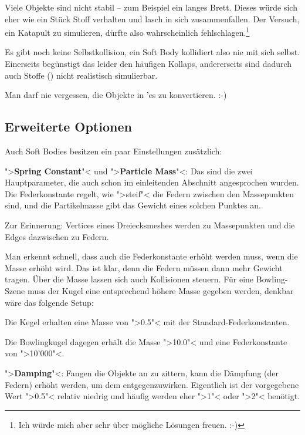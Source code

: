 \documentclass[10pt,DIV=14,a4paper]{scrartcl}
\begin{document}
	\item Viele Objekte sind nicht stabil -- zum Beispiel ein langes
	Brett. Dieses würde sich eher wie ein Stück Stoff verhalten und
	lasch in sich zusammenfallen. Der Versuch, ein Katapult zu
	simulieren, dürfte also wahrscheinlich fehlschlagen.\footnote{Ich
	würde mich aber sehr über mögliche Lösungen freuen. :-)}

	\item Es gibt noch keine Selbstkollision, ein Soft Body kollidiert
	also nie mit sich selbst. Einerseits begünstigt das leider den
	häufigen Kollaps, andererseits sind dadurch auch Stoffe
	() nicht realistisch simulierbar.

	\item Man darf nie vergessen, die Objekte in \TriMesh'es zu
	konvertieren. :-)

\itE

\subsection{Erweiterte Optionen}
Auch Soft Bodies besitzen ein paar Einstellungen zusätzlich:
\itA
	\item ">\textbf{Spring Constant}"< und ">\textbf{Particle Mass}"<:
	Das sind die zwei Hauptparameter, die auch schon im einleitenden
	Abschnitt angesprochen wurden. Die Federkonstante regelt, wie
	">steif"< die Federn zwischen den Massepunkten sind, und die
	Partikelmasse gibt das Gewicht eines solchen Punktes an.

	Zur Erinnerung: Vertices eines Dreiecksmeshes werden zu Massepunkten
	und die Edges dazwischen zu Federn.

	Man erkennt schnell, dass auch die Federkonstante erhöht werden
	muss, wenn die Masse erhöht wird. Das ist klar, denn die Federn
	müssen dann mehr Gewicht tragen. Über die Masse lassen sich auch
	Kollisionen steuern. Für eine Bowling-Szene muss der Kugel eine
	entsprechend höhere Masse gegeben werden, denkbar wäre das folgende
	Setup:

	\itA
		\item Die Kegel erhalten eine Masse von ">0.5"< mit der
		Standard-Federkonstanten.

		\item Die Bowlingkugel dagegen erhält die Masse ">10.0"< und
		eine Federkonstante von ">10'000"<.
	\itE

	\item ">\textbf{Damping}"<: Fangen die Objekte an zu zittern, kann
	die Dämpfung (der Federn) erhöht werden, um dem entgegenzuwirken.
	Eigentlich ist der vorgegebene Wert ">0.5"< relativ niedrig und
	häufig werden eher ">1"< oder ">2"< benötigt.
\end{document}
